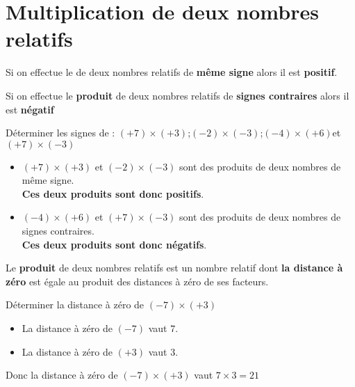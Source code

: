 \section{Multiplication de deux nombres relatifs}

\begin{propriete}
  Si on effectue le \textbf{} de deux nombres relatifs de \textbf{m\^{e}me signe} alors il est \textbf{positif}.
\end{propriete}

\begin{propriete}
  Si on effectue le \textbf{produit} de deux nombres relatifs de \textbf{signes contraires} alors il est \textbf{n\'egatif}
\end{propriete}

\begin{exemple*1}
  Déterminer les signes de : $(+7)\times (+3)$\hfill ;\hfill$(-2)\times(-3)$\hfill ;\hfill $(-4)\times(+6)$\hfill et \hfill $(+7)\times(-3)$
  \correction
  \begin{itemize}
    \item $(+7)\times (+3)$ et $(-2)\times(-3)$ sont des produits de deux nombres de même signe.\\
    \textbf{Ces deux produits sont donc positifs}.
    \item $(-4)\times(+6)$ et $(+7)\times(-3)$ sont des produits de deux nombres de signes contraires.\\
    \textbf{Ces deux produits sont donc négatifs}.
  \end{itemize}
\end{exemple*1}

\begin{propriete}
  Le \textbf{produit} de deux nombres relatifs est un nombre relatif dont \textbf{la distance à zéro} est égale au produit des distances à zéro de ses facteurs.
\end{propriete}

\begin{exemple*1}
  Déterminer la distance à zéro de $(-7)\times (+3)$
  \correction
  \begin{itemize}
    \item La distance à zéro de $(-7)$ vaut $7$.
    \item La distance à zéro de $(+3)$ vaut $3$.
  \end{itemize}
  Donc la distance à zéro de $(-7)\times (+3)$ vaut $7\times 3= 21$
\end{exemple*1}

